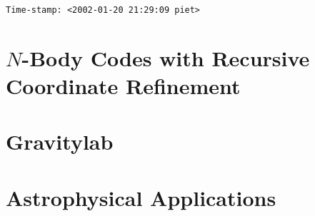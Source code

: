 \documentclass{book}
\begin{document}
  \frontmatter
\makebox[3.5in][s]{}\verb=Time-stamp: <2002-01-20 21:29:09 piet>=
%
%
%
%
%
%
    
  \mainmatter
      
    \part{$N$-Body Codes with Recursive Coordinate Refinement}
      
      
    \part{Gravitylab}
      
      
    \part{Astrophysical Applications}
      
      
      
%      
%      
  \backmatter
\end{document}
